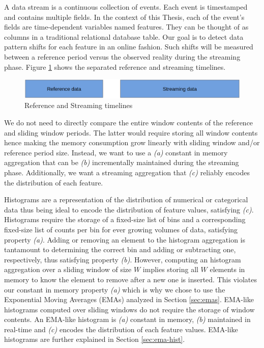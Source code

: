 A data stream is a continuous collection of events. Each event is timestamped and contains multiple fields. In the context of this Thesis, each of the event's fields are time-dependent variables named features. They can be thought of as columns in a traditional relational database table. Our goal is to detect data pattern shifts for each feature in an online fashion. Such shifts will be measured between a reference period versus the observed reality during the streaming phase. Figure \ref{fig:timelines} shows the separated reference and streaming timelines.

\begin{figure}[!htb]
    \begin{center}
      \includegraphics[scale=0.4]{figures/timeperiods.png}
      \caption[]{Reference and Streaming timelines}
      \label{fig:timelines}
    \end{center}
\end{figure}


We do not need to directly compare the entire window contents of the reference and sliding window periods. The latter would require storing all window contents hence making the memory consumption grow linearly with sliding window and/or reference period size. Instead, we want to use a  \textit{(a)} constant in memory aggregation that can be \textit{(b)} incrementally maintained during the streaming phase. Additionally, we want a streaming aggregation that \textit{(c)} reliably encodes the distribution of each feature. 

Histograms are a representation of the distribution of numerical or categorical data thus being ideal to encode the distribution of feature values, satisfying \textit{(c)}. Histograms require the storage of a fixed-size list of bins and a corresponding fixed-size list of counts per bin for ever growing volumes of data, satisfying property \textit{(a)}. Adding or removing an element to the histogram aggregation is tantamount to determining the correct bin and adding or subtracting one, respectively, thus satisfying property \textit{(b)}. However, computing an histogram aggregation over a sliding window of size $W$ implies storing all $W$ elements in memory to know the element to remove after a new one is inserted. This violates our constant in memory property \textit{(a)} which is why we chose to use the Exponential Moving Averages (EMAs) analyzed in Section \ref{sec:emas}. EMA-like histograms computed over sliding windows do not require the storage of window contents. An EMA-like histogram is \textit{(a)} constant in memory, \textit{(b)} maintained in real-time and \textit{(c)} encodes the distribution of each feature values. EMA-like histograms are further explained in Section \ref{sec:ema-hist}.

